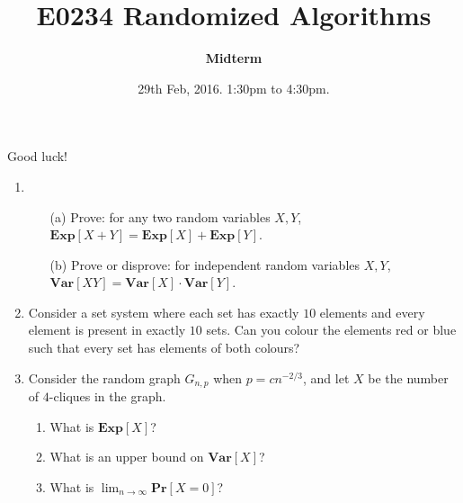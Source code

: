 \documentclass[11pt]{article}
\def\Pr{\mathbf{Pr}}
\def\Exp{\mathbf{Exp}}
\def\Var{\mathbf{Var}}
\def\Pr{\mathbf{Pr}}
\def\Exp{\mathbf{Exp}}
\def\Var{\mathbf{Var}}
\begin{document}
\title{E0234 Randomized Algorithms}
\author{\bf Midterm}
\date{29th Feb, 2016. 1:30pm to 4:30pm.}
\maketitle
\thispagestyle{empty}
\def\poly{{\tt poly}}
\begin{center}
{\small 
Good luck!
}


\end{center}

\begin{enumerate}
	

\item 
\begin{enumerate}
\item[(a)] Prove: for any two random variables $X,Y$, $\Exp[X+Y] = \Exp[X] + \Exp[Y]$.
\item[(b)]
Prove or disprove: for independent random variables $X,Y$, \mbox{$\Var[XY] = \Var[X]\cdot \Var[Y]$.}

\end{enumerate}
\vspace{0.5ex}

\item 
Consider a set system where each set has exactly $10$ elements and every element is present in exactly $10$ sets. 
Can you colour the elements red or blue such that every set has elements of both colours?
%
\vspace{0.5ex}

\item Consider the random graph $G_{n,p}$ when $p = cn^{-2/3}$, and let $X$ be the number of $4$-cliques in the graph. 
\begin{enumerate}
	\item  What is $\Exp[X]$?
	\item  What is an upper bound on $\Var[X]$?
	\item  What is $\lim_{n\to \infty} \Pr[X = 0]$? 
\end{enumerate}
\vspace{0.5ex}


\end{enumerate}
\end{document}
